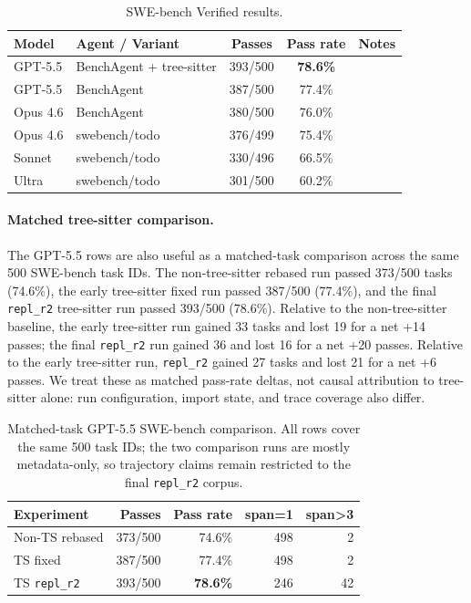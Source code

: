 \documentclass[11pt, logo, onecolumn, copyright, colorlinks=true, allcolors=blue]{nvidiatechreport}
\begin{document}
\begin{table}[h]
\centering
\caption{SWE-bench Verified results.}
\label{tab:swebench-results}
\begin{tabular}{llccl}
\toprule
\textbf{Model} & \textbf{Agent / Variant} & \textbf{Passes} & \textbf{Pass rate} & \textbf{Notes} \\
\midrule
GPT-5.5 & BenchAgent + tree-sitter & 393/500 & \textbf{78.6\%} & \\
GPT-5.5 & BenchAgent & 387/500 & 77.4\% & \\
Opus 4.6 & BenchAgent & 380/500 & 76.0\% & \\
Opus 4.6 & swebench/todo & 376/499 & 75.4\% & \\
Sonnet & swebench/todo & 330/496 & 66.5\% & \\
Ultra & swebench/todo & 301/500 & 60.2\% & \\
\bottomrule
\end{tabular}
\end{table}

\paragraph{Matched tree-sitter comparison.}
The GPT-5.5 rows are also useful as a matched-task comparison across the same
500 SWE-bench task IDs. The non-tree-sitter rebased run passed 373/500 tasks
(74.6\%), the early tree-sitter fixed run passed 387/500 (77.4\%), and the final
\texttt{repl\_r2} tree-sitter run passed 393/500 (78.6\%). Relative to the
non-tree-sitter baseline, the early tree-sitter run gained 33 tasks and lost 19
for a net +14 passes; the final \texttt{repl\_r2} run gained 36 and lost 16 for
a net +20 passes. Relative to the early tree-sitter run, \texttt{repl\_r2}
gained 27 tasks and lost 21 for a net +6 passes. We treat these as matched
pass-rate deltas, not causal attribution to tree-sitter alone: run configuration,
import state, and trace coverage also differ.

\begin{table}[h]
\centering
\caption{Matched-task GPT-5.5 SWE-bench comparison. All rows cover the same 500
task IDs; the two comparison runs are mostly metadata-only, so trajectory claims
remain restricted to the final \texttt{repl\_r2} corpus.}
\label{tab:swebench-ts-comparison}
\begin{tabular}{lrrrr}
\toprule
\textbf{Experiment} & \textbf{Passes} & \textbf{Pass rate} & \textbf{span=1} & \textbf{span>3} \\
\midrule
Non-TS rebased & 373/500 & 74.6\% & 498 & 2 \\
TS fixed & 387/500 & 77.4\% & 498 & 2 \\
TS \texttt{repl\_r2} & 393/500 & \textbf{78.6\%} & 246 & 42 \\
\bottomrule
\end{tabular}
\end{table}
\end{document}
